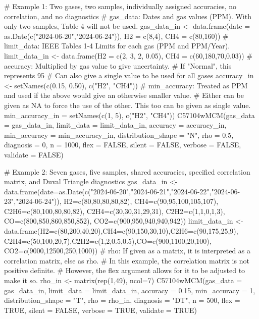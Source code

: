 \documentclass[a4paper]{book}
\begin{document}
%
\begin{Examples}
\begin{ExampleCode}
# Example 1: Two gases, two samples, individually assigned accuracies, no correlation, and no diagnostics
# gas_data: Dates and gas values (PPM). With only two samples, Table 4 will not be used.
gas_data_in <- data.frame(date = as.Date(c("2024-06-20","2024-06-24")),
                          H2 = c(8,4), CH4 = c(80,160))
# limit_data: IEEE Tables 1-4 Limits for each gas (PPM and PPM/Year).
limit_data_in <- data.frame(H2 = c(2, 3, 2, 0.05), CH4 = c(60,180,70,0.03))
# accuracy: Multiplied by gas value to give uncertainty.
# If "Normal", this represents 95%
# Can also give a single value to be used for all gases
accuracy_in <- setNames(c(0.15, 0.50), c("H2", "CH4"))
# min_accuracy: Treated as PPM and used if the above would give an otherwise smaller value.
# Either can be given as NA to force the use of the other. This too can be given as single value.
min_accuracy_in = setNames(c(1, 5), c("H2", "CH4"))
C57104wMCM(gas_data = gas_data_in,
           limit_data = limit_data_in,
           accuracy = accuracy_in,
           min_accuracy = min_accuracy_in,
           distribution_shape = "N",
           rho = 0.5,
           diagnosis = 0,
           n = 1000,
           flex = FALSE, silent = FALSE, verbose = FALSE, validate = FALSE)

# Example 2: Seven gases, five samples, shared accuracies, specified correlation matrix, and Duval Triangle diagnostics
gas_data_in <- data.frame(date=as.Date(c("2024-06-20","2024-06-21","2024-06-22","2024-06-23","2024-06-24")),
                          H2=c(80,80,80,80,82), CH4=c(90,95,100,105,107), C2H6=c(80,100,80,80,82),
                          C2H4=c(30,30,31,29,31), C2H2=c(1,1,0,1,3), CO=c(800,850,860,850,852),
                          CO2=c(900,950,940,940,942))
limit_data_in <- data.frame(H2=c(80,200,40,20),CH4=c(90,150,30,10),C2H6=c(90,175,25,9),
                            C2H4=c(50,100,20,7),C2H2=c(1,2,0.5,0.5),CO=c(900,1100,20,100),
                            CO2=c(9000,12500,250,1000))
# rho: If given as a matrix, it is interpreted as a correlation matrix, else as rho.
# In this example, the correlation matrix is not positive definite.
# However, the flex argument allows for it to be adjusted to make it so.
rho_in <- matrix(rep(1,49), ncol=7)
C57104wMCM(gas_data = gas_data_in,
           limit_data = limit_data_in,
           accuracy = 0.15,
           min_accuracy = 1,
           distribution_shape = "T",
           rho = rho_in,
           diagnosis = "DT",
           n = 500,
           flex = TRUE, silent = FALSE, verbose = TRUE, validate = TRUE)
\end{ExampleCode}
\end{Examples}
\end{document}
